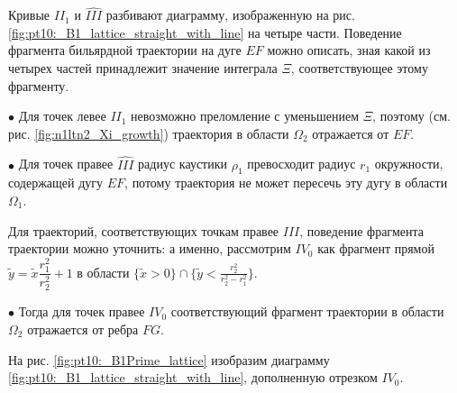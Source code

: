 

Кривые $II_1$ и $\widehat{III}$ разбивают диаграмму, изображенную на рис. \ref{fig:pt10:_B1_lattice_straight_with_line} на четыре части.
Поведение фрагмента бильярдной траектории на дуге $EF$ можно описать, зная какой из четырех частей принадлежит значение интеграла $\Xi$, соответствующее этому фрагменту.

$\bullet$ Для точек левее $II_1$ невозможно преломление с уменьшением $\Xi$, поэтому (см. рис.     \ref{fig:n1ltn2_Xi_growth}) траектория в области $\Omega_2$ отражается от $EF$.

$\bullet$ Для точек правее $\widehat{III}$ радиус каустики $\rho_1$ превосходит радиус $r_1$ окружности, содержащей дугу $EF$, потому траектория не может пересечь эту дугу в области $\Omega_1$.

Для траекторий, соответствующих точкам правее $\widehat{III}$, поведение фрагмента траектории можно уточнить:
а именно, рассмотрим  $IV_0$ как фрагмент прямой $\widetilde{y} = \widetilde{x}\dfrac{r_1^2}{r_2^2} + 1$ в области $\{ \widetilde{x}> 0\} \cap \{\widetilde{y}< \frac{r_2^2}{r_2^2-r_1^2} \}$.

$\bullet$ Тогда для точек правее $IV_0$ соответствующий фрагмент траектории в области $\Omega_2$ отражается от ребра $FG$.

На рис. \ref{fig:pt10:_B1Prime_lattice} изобразим диаграмму \ref{fig:pt10:_B1_lattice_straight_with_line}, дополненную отрезком $IV_0$.


